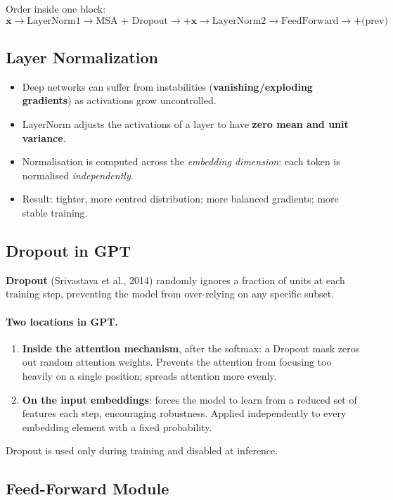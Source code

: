 \documentclass[11pt,a4paper]{article}
\theoremstyle{definition}
\theoremstyle{plain}
\theoremstyle{remark}
\begin{document}
Order inside one block:
\[
    \mathbf{x} \to \text{LayerNorm1} \to \text{MSA + Dropout} \to + \mathbf{x} \to \text{LayerNorm2} \to \text{FeedForward} \to + \text{(prev)}
\]

\subsection{Layer Normalization}

\begin{itemize}
    \item Deep networks can suffer from instabilities (\textbf{vanishing/exploding gradients}) as activations grow uncontrolled.
    \item LayerNorm adjusts the activations of a layer to have \textbf{zero mean and unit variance}.
    \item Normalisation is computed across the \emph{embedding dimension}: each token is normalised \emph{independently}.
    \item Result: tighter, more centred distribution; more balanced gradients; more stable training.
\end{itemize}

\subsection{Dropout in GPT}

\textbf{Dropout} (Srivastava et al., 2014) randomly ignores a fraction of units at each training step, preventing the model from over-relying on any specific subset.

\paragraph{Two locations in GPT.}
\begin{enumerate}
    \item \textbf{Inside the attention mechanism}, after the softmax: a Dropout mask zeros out random attention weights. Prevents the attention from focusing too heavily on a single position; spreads attention more evenly.
    \item \textbf{On the input embeddings}: forces the model to learn from a reduced set of features each step, encouraging robustness. Applied independently to every embedding element with a fixed probability.
\end{enumerate}
Dropout is used only during training and disabled at inference.

\subsection{Feed-Forward Module}
\end{document}

